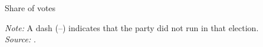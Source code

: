 \documentclass[xcolor=dvipsnames, aspectratio=169]{beamer}
\begin{document}
\begin{frame}{Share of votes}

\begin{table}[htbp]
\centering
\tiny   %
\caption{Mean vote shares by party and year}

\label{tab:means_votes}

{\textit{Note:} A dash (--) indicates that the party did not run in that election. \\
\textit{Source:} \cite{piketty_histoire_2023}.}

\end{table}

\end{frame}
\end{document}
